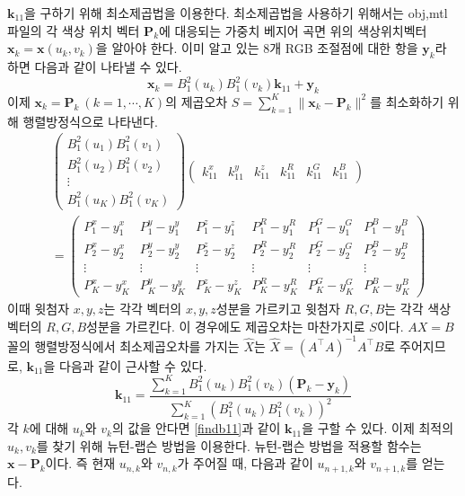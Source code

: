 \documentclass{gshs_thesis}
\theoremstyle{theorem}
\theoremstyle{lemma}
\theoremstyle{definition}
\begin{document}
$\mathbf{k}_{11}$을 구하기 위해 최소제곱법을 이용한다. 
최소제곱법을 사용하기 위해서는 obj,mtl 파일의 각 색상 위치 벡터 $\mathbf{P}_k$에 대응되는 가중치 베지어 곡면 위의 색상위치벡터 $\mathbf{x}_k=\mathbf{x}(u_k, v_k)$을 알아야 한다. 이미 알고 있는 8개 RGB 조절점에 대한 항을 $\mathbf{y}_k$라 하면 다음과 같이 나타낼 수 있다. 
\begin{equation*}
	\mathbf{x}_k=B_1^2(u_k)B_1^2(v_k)\mathbf{k}_{11}+\mathbf{y}_k
\end{equation*}
이제 $\mathbf{x}_k=\mathbf{P}_k\ (k=1, \cdots, K)$의 제곱오차 $S=\sum_{k=1}^K \| \mathbf{x}_k-\mathbf{P}_k \|^2$를 최소화하기 위해 행렬방정식으로 나타낸다.
\begin{equation*}
	\begin{split}
	&\begin{pmatrix}
		B_1^2(u_1)B_1^2(v_1) \\ B_1^2(u_2)B_1^2(v_2) \\ \vdots \\ B_1^2(u_K)B_1^2(v_K) 
	\end{pmatrix} \begin{pmatrix}
		k_{11}^x & k_{11}^y & k_{11}^z & k_{11}^R & k_{11}^G & k_{11}^B
	\end{pmatrix}  \\
    &= \begin{pmatrix}
		P_1^x-y_1^x & P_1^y-y_1^y & P_1^z-y_1^z & P_1^R-y_1^R & P_1^G-y_1^G & P_1^B-y_1^B \\ P_2^x-y_2^x & P_2^y-y_2^y & P_2^z-y_2^z & P_2^R-y_2^R & P_2^G-y_2^G & P_2^B-y_2^B \\ \vdots & \vdots & \vdots & \vdots & \vdots & \vdots\\ 
		P_K^x-y_K^x & P_K^y-y_K^y & P_K^z-y_K^z & P_K^R-y_K^R & P_K^G-y_K^G & P_K^B-y_K^B
	\end{pmatrix}
    \end{split}
\end{equation*}
이때 윗첨자 $x, y, z$는 각각 벡터의 $x, y, z$성분을 가르키고 윗첨자 $R, G, B$는 각각 색상 벡터의 $R, G, B$성분을 가르킨다. 이 경우에도 제곱오차는 마찬가지로 $S$이다. $AX=B$ 꼴의 행렬방정식에서 최소제곱오차를 가지는 $\hat{X}$는 $\hat{X}=(A^\intercal A)^{-1}A^\intercal B$로 주어지므로, $\mathbf{k}_{11}$을 다음과 같이 근사할 수 있다. 
\begin{equation} \label{findb11}
	\mathbf{k}_{11}=\frac{\sum_{k=1}^K B_1^2(u_k)B_1^2(v_k)(\mathbf{P}_k-\mathbf{y}_k)}{\sum_{k=1}^K (B_1^2(u_k)B_1^2(v_k))^2}
\end{equation}
각 $k$에 대해 $u_k$와 $v_k$의 값을 안다면 \cref{findb11}과 같이 $\mathbf{k}_{11}$을 구할 수 있다. 이제 최적의 $u_k, v_k$를 찾기 위해 뉴턴-랩슨 방법을 이용한다. 뉴턴-랩슨 방법을 적용할 함수는 $\mathbf{x}-\mathbf{P}_k$이다. 즉 현재 $u_{n, k}$와 $v_{n, k}$가 주어질 때, 다음과 같이 $u_{n+1, k}$와 $v_{n+1, k}$를 얻는다.
\end{document}
